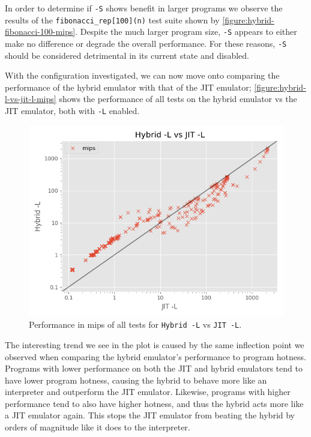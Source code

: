 In order to determine if \texttt{-S} shows benefit in larger programs we observe the results of the \texttt{fibonacci\_rep[100](n)} test suite shown by \autoref{figure:hybrid-fibonacci-100-mips}. Despite the much larger program size, \texttt{-S} appears to either make no difference or degrade the overall performance. For these reasons, \texttt{-S} should be considered detrimental in its current state and disabled.

With the configuration investigated, we can now move onto comparing the performance of the hybrid emulator with that of the JIT emulator; \autoref{figure:hybrid-l-vs-jit-l-mips} shows the performance of all tests on the hybrid emulator vs the JIT emulator, both with \texttt{-L} enabled.

\begin{figure}[H]
    \centering
    \includegraphics[scale=0.75]{output/graphs/scatter/vs/JIT -L-vs-Hybrid -L-mips.png}
    \caption{Performance in mips of all tests for \texttt{Hybrid -L} vs \texttt{JIT -L}.}
    \label{figure:hybrid-l-vs-jit-l-mips}
\end{figure}

The interesting trend we see in the plot is caused by the same inflection point we observed when comparing the hybrid emulator's performance to program hotness. Programs with lower performance on both the JIT and hybrid emulators tend to have lower program hotness, causing the hybrid to behave more like an interpreter and outperform the JIT emulator. Likewise, programs with higher performance tend to also have higher hotness, and thus the hybrid acts more like a JIT emulator again. This stops the JIT emulator from beating the hybrid by orders of magnitude like it does to the interpreter.

